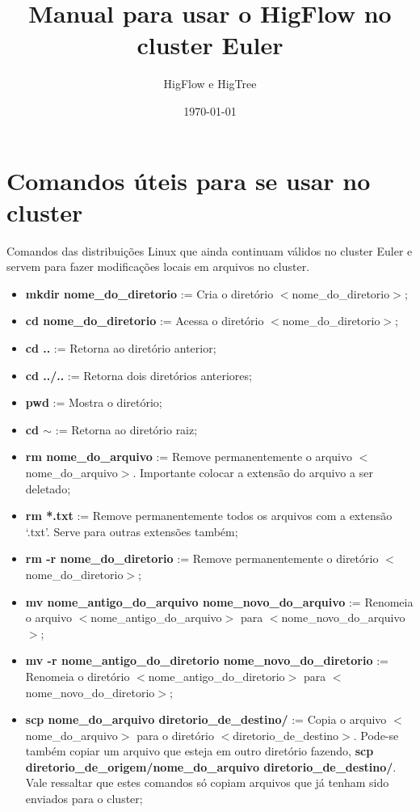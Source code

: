 \documentclass[12pt]{article}
\begin{document}
\title{Manual para usar o HigFlow no cluster Euler}
\author{HigFlow e HigTree}
\date{\today}
\maketitle

\section{Comandos úteis para se usar no cluster}\label{sec:comandos_uteis}
Comandos das distribuições Linux que ainda continuam válidos no cluster Euler e servem para fazer modificações locais em arquivos no cluster.

\begin{itemize}
	\item \textbf{mkdir nome\_do\_diretorio} := Cria o diretório $<$nome\_do\_diretorio$>$;
	\item \textbf{cd nome\_do\_diretorio} := Acessa o diretório $<$nome\_do\_diretorio$>$;
	\item \textbf{cd ..} := Retorna ao diretório anterior;
	\item \textbf{cd ../..} := Retorna dois diretórios anteriores;
	\item \textbf{pwd} := Mostra o diretório;
	\item \textbf{cd $\sim$} := Retorna ao diretório raiz;
	\item \textbf{rm nome\_do\_arquivo} := Remove permanentemente o arquivo $<$nome\_do\_arquivo$>$. Importante colocar a extensão do arquivo a ser deletado;
	\item \textbf{rm *.txt} := Remove permanentemente todos os arquivos com a extensão `.txt'. Serve para outras extensões também;
	\item \textbf{rm -r nome\_do\_diretorio} := Remove permanentemente o diretório $<$nome\_do\_diretorio$>$;
	\item \textbf{mv nome\_antigo\_do\_arquivo nome\_novo\_do\_arquivo} := Renomeia o arquivo $<$nome\_antigo\_do\_arquivo$>$ para $<$nome\_novo\_do\_arquivo$>$;
	\item \textbf{mv -r nome\_antigo\_do\_diretorio nome\_novo\_do\_diretorio} := Renomeia o diretório $<$nome\_antigo\_do\_diretorio$>$ para $<$nome\_novo\_do\_diretorio$>$;
	\item \textbf{scp nome\_do\_arquivo diretorio\_de\_destino/} := Copia o arquivo $<$nome\_do\_arquivo$>$ para o diretório $<$diretorio\_de\_destino$>$. Pode-se também copiar um arquivo que esteja em outro diretório fazendo, \textbf{scp diretorio\_de\_origem/nome\_do\_arquivo diretorio\_de\_destino/}. Vale ressaltar que estes comandos só copiam arquivos que já tenham sido enviados para o cluster;

\end{itemize}
\end{document}
